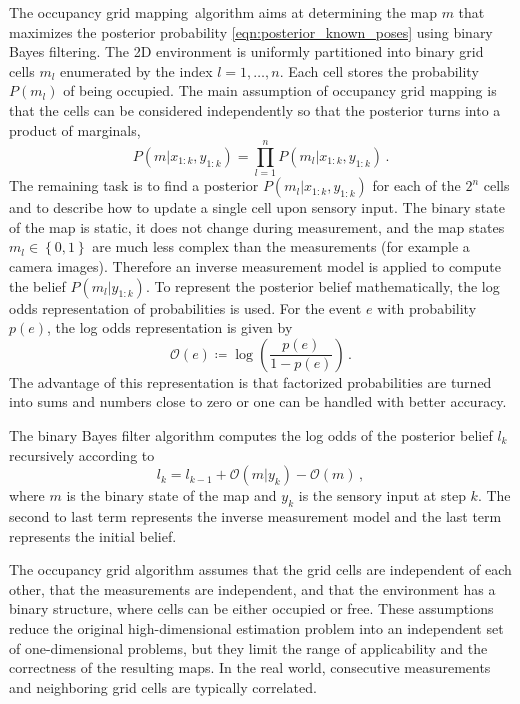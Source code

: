 \documentclass[10pt, journal, compsoc]{IEEEtran}
\newcommand{\ogm}{occupancy grid mapping}
\begin{document}
The \ogm\ algorithm aims at determining the map $m$ that maximizes the posterior probability \ref{eqn:posterior_known_poses} using binary Bayes filtering. The 2D environment is uniformly partitioned into binary grid cells $m_l$ enumerated by the index $l = 1, \ldots, n$. Each cell stores the probability $P(m_l)$ of being occupied. The main assumption of occupancy grid mapping is that the cells can be considered independently so that the posterior turns into a product of marginals,
\begin{equation}
P\left( m \vert x_{1:k}, y_{1:k} \right)
=
\prod_{l=1}^{n}
P\left(m_l \vert x_{1:k},  y_{1:k}\right) \, .
\end{equation}
The remaining task is to find a posterior $P\left(m_l\vert x_{1:k},  y_{1:k}\right)$ for each of the $2^n$ cells and to describe how to update a single cell upon sensory input. The binary state of the map is static, it does not change during measurement, and the map states $m_l \in \left\lbrace 0,1\right\rbrace$ are much less complex than the measurements (for example a camera images). Therefore an inverse measurement model is applied to compute the belief $P\left(m_l \vert y_{1:k} \right)$. To represent the posterior belief mathematically, the log odds representation of probabilities is used. For the event $e$ with probability $p(e)$, the log odds representation is given by
\begin{equation}
\mathcal{O} \left(e\right) \coloneqq
\log 
\left(\frac{p\left(e\right)}{1-p\left(e\right)}\right) \, .
\end{equation}
The advantage of this representation is that factorized probabilities are turned into sums and numbers close to zero or one can be handled with better accuracy.

The binary Bayes filter algorithm computes the log odds of the posterior belief $l_k$ recursively according to
\begin{equation}
l_k = l_{k-1}
+ \mathcal{O} \left(m \vert y_k \right)
- \mathcal{O} \left(m \right) \, ,
\end{equation}
where $m$ is the binary state of the map and $y_k$ is the sensory input at step $k$. The second to last term represents the inverse measurement model and the last term represents the initial belief.

The occupancy grid algorithm assumes that the grid cells are independent of each other, that the measurements are independent, and that the environment has a binary structure, where cells can be either occupied or free. These assumptions reduce the original high-dimensional estimation problem into an independent set of one-dimensional problems, but they limit the range of applicability and the correctness of the resulting maps. In the real world, consecutive measurements and neighboring grid cells are typically correlated.
\end{document}
